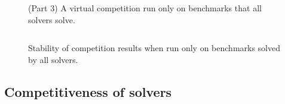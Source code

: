 \documentclass[smallcondensed]{svjour3}
\begin{document}
\begin{figure}
\centering
\begin{tabular}{|p{.01in}rrrl|}
\hline

\end{tabular}
\caption{(Part 3) A virtual competition run only on benchmarks that all solvers solve.}
\label{Fig:virtual-competition-solved3}
\end{figure}


\begin{figure}
\centering
\begin{tabular}{|lrr|rr|}
\hline

\end{tabular}
\caption{Stability of competition results when run only on benchmarks solved by all solvers.}
\label{Fig:virtual-competition-solved-some}
\end{figure}

\subsection{Competitiveness of solvers}
\label{Competitiveness}
\end{document}
